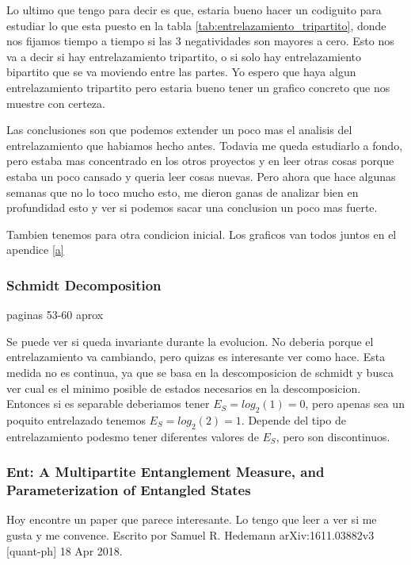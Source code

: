 Lo ultimo que tengo para decir es que, estaria bueno hacer un codiguito para estudiar lo que esta puesto en la tabla \ref{tab:entrelazamiento_tripartito}, donde nos fijamos tiempo a tiempo si las 3 negatividades son mayores a cero. Esto nos va a decir si hay entrelazamiento tripartito, o si solo hay entrelazamiento bipartito que se va moviendo entre las partes. Yo espero que haya algun entrelazamiento tripartito pero estaria bueno tener un grafico concreto que nos muestre con certeza. 

Las conclusiones son que podemos extender un poco mas el analisis del entrelazamiento que habiamos hecho antes. Todavia me queda estudiarlo a fondo, pero estaba mas concentrado en los otros proyectos y en leer otras cosas porque estaba un poco cansado y queria leer cosas nuevas. Pero ahora que hace algunas semanas que no lo toco mucho esto, me dieron ganas de analizar bien en profundidad esto y ver si podemos sacar una conclusion un poco mas fuerte. 

Tambien tenemos para otra condicion inicial. Los graficos van todos juntos en el apendice \ref{a}
\subsubsection{Schmidt Decomposition}
 paginas 53-60 aprox

Se puede ver si queda invariante durante la evolucion. No deberia porque el entrelazamiento va cambiando, pero quizas es interesante ver como hace. Esta medida no es continua, ya que se basa en la descomposicion de schmidt y busca ver cual es el minimo posible de estados necesarios en la descomposicion. Entonces si es separable deberiamos tener $E_S=log_2(1)=0$, pero apenas sea un poquito entrelazado tenemos $E_S=log_2(2)=1$. Depende del tipo de entrelazamiento podesmo tener diferentes valores de $E_S$, pero son discontinuos.

\subsubsection{Ent: A Multipartite Entanglement Measure, and Parameterization of Entangled States}

Hoy encontre un paper que parece interesante. Lo tengo que leer a ver si me gusta y me convence. Escrito por  Samuel R. Hedemann  arXiv:1611.03882v3  [quant-ph]  18 Apr 2018.


